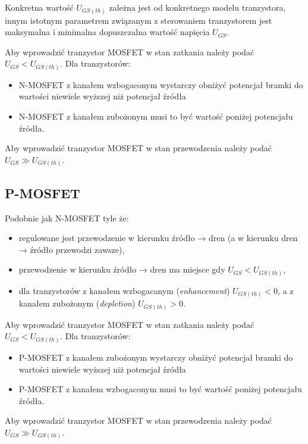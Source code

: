 \documentclass{pdfBooklets}
\begin{document}
Konkretna wartość $U_{GS (th)}$ zależna jest od konkretnego modelu tranzystora, innym istotnym parametrem związanym z sterowaniem tranzystorem jest maksymalna i minimalna dopuszczalna wartość napięcia $U_{GS}$.

Aby wprowadzić tranzystor MOSFET w stan zatkania należy podać $U_{GS} < U_{GS (th)}$. Dla tranzystorów:
\begin{itemize}
\item N-MOSFET z kanałem wzbogaconym wystarczy obniżyć potencjał bramki do wartości niewiele wyższej niż potencjał źródła
\item N-MOSFET z kanałem zubożonym musi to być wartość poniżej potencjału źródła.
\end{itemize}
Aby wprowadzić tranzystor MOSFET w stan przewodzenia należy podać $U_{GS} \gg U_{GS (th)}$.

\subsection{P-MOSFET}
Podobnie jak N-MOSFET tyle że:
\begin{itemize}
\item regulowane jest przewodzenie w kierunku źródło → dren (a w kierunku dren → źródło przewodzi zawsze),
\item przewodzenie w kierunku źródło → dren ma miejsce gdy $U_{GS} < U_{GS (th)}$,
\item dla tranzystorów z kanałem wzbogacanym (\emph{enhancement}) $U_{GS (th)} < 0$, a z kanałem zubożonym (\emph{depletion}) $U_{GS (th)} > 0$.
\end{itemize}

Aby wprowadzić tranzystor MOSFET w stan zatkania należy podać $U_{GS} < U_{GS (th)}$. Dla tranzystorów:
\begin{itemize}
\item P-MOSFET z kanałem zubożonym wystarczy obniżyć potencjał bramki do wartości niewiele wyższej niż potencjał źródła
\item P-MOSFET z kanałem wzbogaconym musi to być wartość poniżej potencjału źródła.
\end{itemize}
Aby wprowadzić tranzystor MOSFET w stan przewodzenia należy podać $U_{GS} \gg U_{GS (th)}$.


\begin{Zadanie}{}{}
\end{Zadanie}
\end{document}
